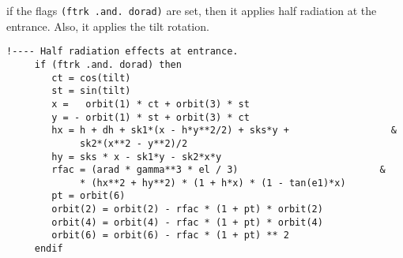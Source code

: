 \documentclass{cern-art} %
\renewcommand{\L}[1]{\lstinline[firstnumber=last]{#1}}
\begin{document}
  if the flags \L{(ftrk .and. dorad)} are set, then it applies half radiation at the entrance. Also, it applies the tilt rotation.
 \begin{lstlisting}[firstnumber=last]
     !---- Half radiation effects at entrance.
     if (ftrk .and. dorad) then
        ct = cos(tilt)
        st = sin(tilt)
        x =   orbit(1) * ct + orbit(3) * st
        y = - orbit(1) * st + orbit(3) * ct
        hx = h + dh + sk1*(x - h*y**2/2) + sks*y +                  &
             sk2*(x**2 - y**2)/2
        hy = sks * x - sk1*y - sk2*x*y
        rfac = (arad * gamma**3 * el / 3)                         &
             * (hx**2 + hy**2) * (1 + h*x) * (1 - tan(e1)*x)
        pt = orbit(6)
        orbit(2) = orbit(2) - rfac * (1 + pt) * orbit(2)
        orbit(4) = orbit(4) - rfac * (1 + pt) * orbit(4)
        orbit(6) = orbit(6) - rfac * (1 + pt) ** 2
     endif
  \end{lstlisting}


\end{document}
